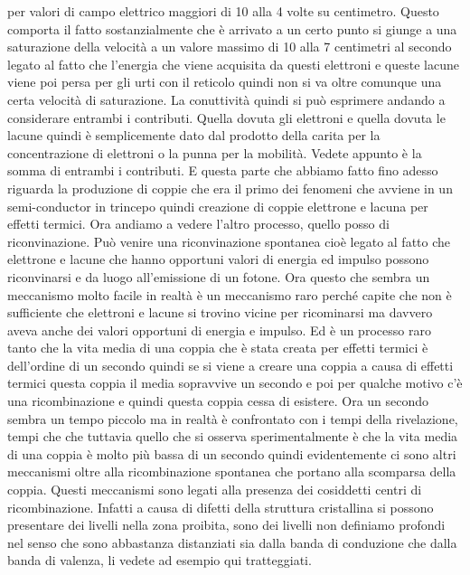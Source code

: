per valori di campo elettrico maggiori di 10 alla 4 volte su centimetro. Questo comporta il fatto sostanzialmente che è arrivato a un certo punto si giunge a una saturazione della velocità a un valore massimo di 10 alla 7 centimetri al secondo legato al fatto che l'energia che viene acquisita da questi elettroni e queste lacune viene poi persa per gli urti con il reticolo quindi non si va oltre comunque una certa velocità di saturazione. La conuttività quindi si può esprimere andando a considerare entrambi i contributi. Quella dovuta gli elettroni e quella dovuta le lacune quindi è semplicemente dato dal prodotto della carita per la concentrazione di elettroni o la punna per la mobilità. Vedete appunto è la somma di entrambi i contributi. E questa parte che abbiamo fatto fino adesso riguarda la produzione di coppie che era il primo dei fenomeni che avviene in un semi-conductor in trincepo quindi creazione di coppie elettrone e lacuna per effetti termici. Ora andiamo a vedere l'altro processo, quello posso di riconvinazione. Può venire una riconvinazione spontanea cioè legato al fatto che elettrone e lacune che hanno opportuni valori di energia ed impulso possono riconvinarsi e da luogo all'emissione di un fotone. Ora questo che sembra un meccanismo molto facile in realtà è un meccanismo raro perché capite che non è sufficiente che elettroni e lacune si trovino vicine per ricominarsi ma davvero aveva anche dei valori opportuni di energia e impulso. Ed è un processo raro tanto che la vita media di una coppia che è stata creata per effetti termici è dell'ordine di un secondo quindi se si viene a creare una coppia a causa di effetti termici questa coppia il media sopravvive un secondo e poi per qualche motivo c'è una ricombinazione e quindi questa coppia cessa di esistere. Ora un secondo sembra un tempo piccolo ma in realtà è confrontato con i tempi della rivelazione, tempi che che tuttavia quello che si osserva sperimentalmente è che la vita media di una coppia è molto più bassa di un secondo quindi evidentemente ci sono altri meccanismi oltre alla ricombinazione spontanea che portano alla scomparsa della coppia. Questi meccanismi sono legati alla presenza dei cosiddetti centri di ricombinazione. Infatti a causa di difetti della struttura cristallina si possono presentare dei livelli nella zona proibita, sono dei livelli non definiamo profondi nel senso che sono abbastanza distanziati sia dalla banda di conduzione che dalla banda di valenza, li vedete ad esempio qui tratteggiati.

